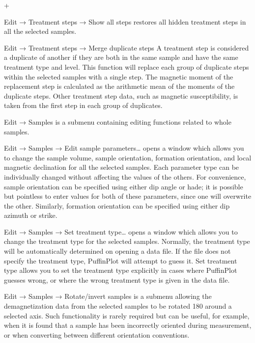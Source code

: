 \documentclass[a4paper,british]{article}
\newcommand{\menuitemlabel}[1]{%
\mbox{\textsf{#1}}\hfil}
\newenvironment{menuitemlist}%
{\begin{list}{}{%
\renewcommand{\makelabel}{\menuitemlabel}%
\setlength{\labelwidth}{35pt}%
\setlength{\leftmargin}%
             {\labelwidth+\labelsep}}}%
{\end{list}}
\newcommand{\ppcmd}[1]{\textsf{#1}} %
\newcommand{\submenu}{ \textrm{→} }
\begin{document}
\begin{menuitemlist}
\item[Edit\submenu Treatment steps\submenu Show all steps] restores all
  hidden treatment steps in all the selected samples.

\item[Edit\submenu Treatment steps\submenu Merge duplicate steps]
  A treatment step is considered a duplicate of another if they
  are both in the same sample and have the same treatment type and
  level. This function will replace each group of duplicate steps
  within the selected samples with a single step. The magnetic moment
  of the replacement step is calculated as the arithmetic mean of the
  moments of the duplicate steps. Other treatment step data, such
  as magnetic susceptibility, is taken from the first step in each
  group of duplicates.

\item[Edit\submenu Samples] is a submenu containing editing functions
  related to whole samples.
  
\item[Edit\submenu Samples\submenu Edit sample parameters\ldots] opens a
  window which allows you to change the sample volume, sample
  orientation, formation orientation, and local magnetic declination for
  all the selected samples. Each parameter type can be individually
  changed without affecting the values of the others. For convenience,
  sample orientation can be specified using either dip angle or hade; it
  is possible but pointless to enter values for both of these
  parameters, since one will overwrite the other. Similarly, formation
  orientation can be specified using either dip azimuth or strike.

\item[Edit\submenu Samples\submenu Set treatment type\ldots] opens a
  window which allows you to change the treatment type for the selected
  samples. Normally, the treatment type will be automatically determined
  on opening a data file. If the file does not specify the treatment
  type, PuffinPlot will attempt to guess it. \ppcmd{Set treatment type}
  allows you to set the treatment type explicitly in cases where
  PuffinPlot guesses wrong, or where the wrong treatment type is given
  in the data file.

\item[Edit\submenu Samples\submenu Rotate/invert samples] is a submenu
  allowing the demagnetization data from the selected samples to be
  rotated 180\textdegree{} around a selected axis. Such functionality is
  rarely required but can be useful, for example, when it is found that
  a sample has been incorrectly oriented during measurement, or when
  converting between different orientation conventions.


\end{menuitemlist}
\end{document}
